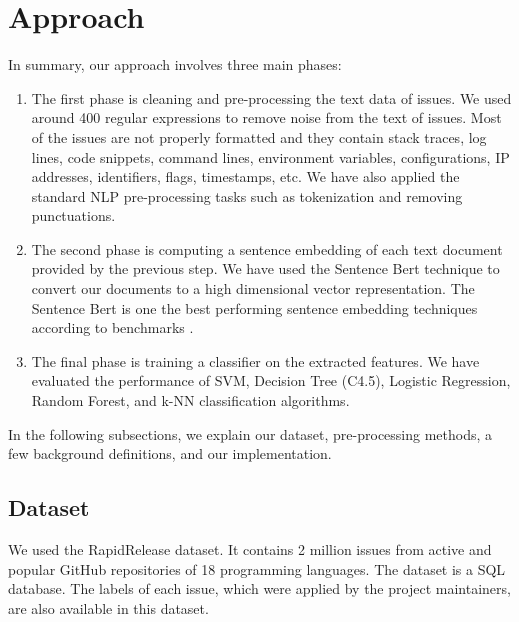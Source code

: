 \documentclass[conference]{IEEEtran}
\begin{document}
\section{Approach}\label{approach}
In summary, our approach involves three main phases:
\begin{enumerate}
  \item The first phase is cleaning and pre-processing the text data of issues. 
  We used around 400 regular expressions to remove noise from the text of issues. 
  Most of the issues are not properly formatted and they contain stack traces, log lines, code snippets, 
  command lines, environment variables, configurations, IP addresses, identifiers, flags, timestamps, etc.
  We have also applied the standard NLP pre-processing tasks such as tokenization and removing punctuations.
  \item The second phase is computing a sentence embedding of each text document provided by 
  the previous step. We have used the Sentence Bert \cite{reimers-2019-sentence-bert} technique to convert our
  documents to a high dimensional vector representation. The Sentence Bert is one the 
  best performing sentence embedding techniques according to benchmarks \cite{reimers-2019-sentence-bert}.
  \item The final phase is training a classifier on the extracted features. We have evaluated
  the performance of SVM, Decision Tree (C4.5), Logistic Regression, Random Forest, and k-NN 
  classification algorithms.
\end{enumerate}

In the following subsections, we explain our dataset, pre-processing methods, a few background definitions, and
our implementation.

\subsection{Dataset}
We used the RapidRelease \cite{8816794} dataset. It contains 2 million issues from active and popular 
GitHub repositories of 18 programming languages. The dataset is a SQL database.
The labels of each issue, which were applied by the project maintainers, are also available in this dataset.
\end{document}
